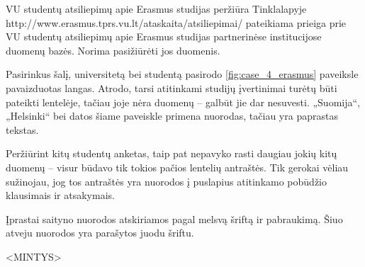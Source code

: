 \begin{xcase}{VU studentų atsiliepimų apie Erasmus studijas peržiūra}
  \xcgoal
  {
    Tinklalapyje http://www.erasmus.tprs.vu.lt/ataskaita/atsiliepimai/
    pateikiama prieiga prie VU studentų atsiliepimų apie Erasmus studijas
    partnerinėse institucijose duomenų bazės. Norima pasižiūrėti jos duomenis.
  }
  
  \xctools
  {
    Pasirinkus šalį, universitetą bei studentą pasirodo
    \ref{fig:case_4_erasmus} paveiksle pavaizduotas langas. Atrodo, tarsi
    atitinkami studijų įvertinimai turėtų būti pateikti lentelėje, tačiau
    joje nėra duomenų – galbūt jie dar nesuvesti. „Suomija“, „Helsinki“ bei
    datos šiame paveiskle primena nuorodas, tačiau yra paprastas tekstas.

  }
  
  \xcresult
  {
    Peržiūrint kitų studentų anketas, taip pat nepavyko rasti daugiau jokių
    kitų duomenų – visur būdavo tik tokios pačios lentelių antraštės. Tik
    gerokai vėliau sužinojau, jog tos antraštės yra nuorodos į puslapius
    atitinkamo pobūdžio klausimais ir atsakymais.
  }
  
  \xcprinciples
  {
    {
      Įprastai saityno nuorodos atskiriamos pagal melsvą šriftą ir
      pabraukimą. Šiuo atveju nuorodos yra parašytos juodu šriftu.
    }
  }
  
  \xcthoughts
  {
    <MINTYS>
  }
\end{xcase}

